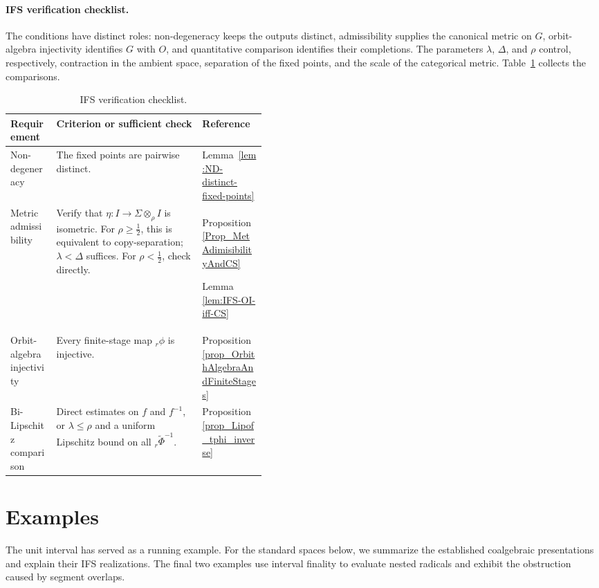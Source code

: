 \documentclass{sn-jnl}%
\theoremstyle{thmstyleone}%
\theoremstyle{thmstyletwo}%
\theoremstyle{thmstylethree}%
\newcommand{\M}{\Sigma}
\newcommand{\Fw}{\M\otimes_{\w}}
\newcommand{\f}{\phi}
\newcommand{\tf}{\tilde{\Phi}}
\newcommand{\w}{\rho}
\begin{document}
\paragraph{IFS verification checklist.}  The conditions have distinct roles: non-degeneracy keeps the outputs distinct, admissibility supplies the canonical metric on $G$, orbit-algebra injectivity identifies $G$ with $O$, and quantitative comparison identifies their completions. The parameters $\lambda$, $\Delta$, and $\rho$ control, respectively, contraction in the ambient space, separation of the fixed points, and the scale of the categorical metric. Table~\ref{tab:IFS_conditions} collects the comparisons.

\begin{table}[htbp]
\centering
\small
\renewcommand{\arraystretch}{1.2}
\begin{tabularx}
 {\linewidth}{@{}
 >{\raggedright\arraybackslash}p{0.18\linewidth}
 >{\raggedright\arraybackslash}X
 >{\raggedright\arraybackslash}p{0.25\linewidth}@{}}
\toprule
Requirement & Criterion or sufficient check & Reference\\
\midrule
\midrule
Non-degeneracy
    & The fixed points are pairwise distinct.
    & Lemma~\ref{lem:ND-distinct-fixed-points}\\
\midrule
Metric admissibility
    & Verify that $\eta:I\to\Fw I$ is isometric. For $\rho\geq\frac12$, this is equivalent to copy-separation; $\lambda<\Delta$ suffices. For $\rho<\frac12$, check directly.
    & Proposition~\ref{Prop_MetAdimisibilityAndCS} \par Lemma \ref{lem:IFS-OI-iff-CS}\\
\midrule
Orbit-algebra injectivity
    & Every finite-stage map ${}_r\f$ is injective.
    & Proposition~\ref{prop_OrbithAlgebraAndFiniteStages}\\
\midrule
Bi-Lipschitz comparison
    & Direct estimates on $f$ and $f^{-1}$, or $\lambda\leq\rho$ and a uniform Lipschitz bound on all ${}_r\tf^{-1}$.
    & Proposition~\ref{prop_Lipof_tphi_inverse}\\
\bottomrule
\end{tabularx}
\caption{IFS verification checklist.}
\label{tab:IFS_conditions}
\end{table}

\section{Examples}
\label{Sec:Examples}
The unit interval has served as a running example. For the standard spaces below, we summarize the established coalgebraic presentations and explain their IFS realizations. The final two examples use interval finality to evaluate nested radicals and exhibit the obstruction caused by segment overlaps.
\end{document}
